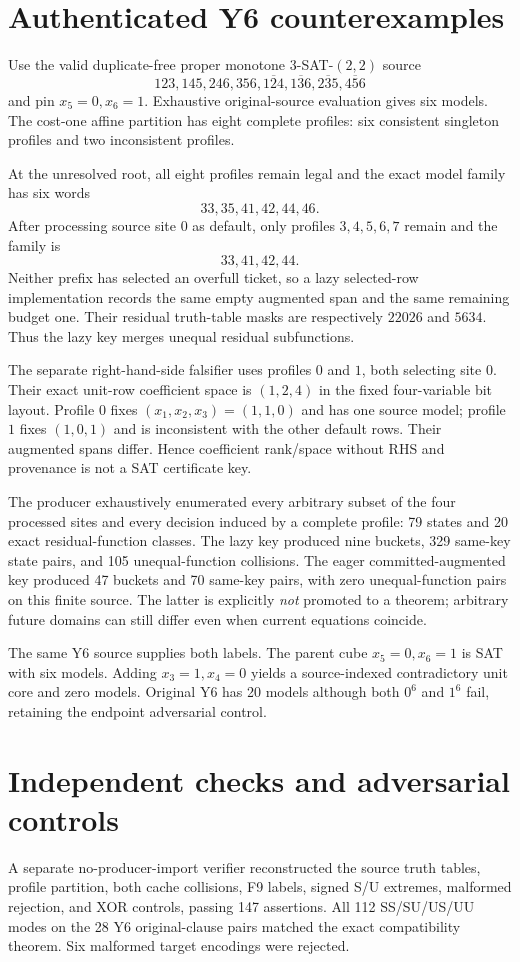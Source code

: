 \documentclass[11pt]{article}
\begin{document}
\section{Authenticated Y6 counterexamples}
Use the valid duplicate-free proper monotone 3-SAT-$(2,2)$ source
\[
123,145,246,356,\overline{124},\overline{136},\overline{235},\overline{456}
\]
and pin $x_5=0,x_6=1$.  Exhaustive original-source evaluation gives six models.  The cost-one affine partition has eight complete profiles: six consistent singleton profiles and two inconsistent profiles.

At the unresolved root, all eight profiles remain legal and the exact model family has six words
\[
 33,35,41,42,44,46.
\]
After processing source site $0$ as default, only profiles $3,4,5,6,7$ remain and the family is
\[
 33,41,42,44.
\]
Neither prefix has selected an overfull ticket, so a lazy selected-row implementation records the same empty augmented span and the same remaining budget one.  Their residual truth-table masks are respectively $22026$ and $5634$.  Thus the lazy key merges unequal residual subfunctions.

The separate right-hand-side falsifier uses profiles $0$ and $1$, both selecting site $0$.  Their exact unit-row coefficient space is $(1,2,4)$ in the fixed four-variable bit layout.  Profile $0$ fixes $(x_1,x_2,x_3)=(1,1,0)$ and has one source model; profile $1$ fixes $(1,0,1)$ and is inconsistent with the other default rows.  Their augmented spans differ.  Hence coefficient rank/space without RHS and provenance is not a SAT certificate key.

The producer exhaustively enumerated every arbitrary subset of the four processed sites and every decision induced by a complete profile: 79 states and 20 exact residual-function classes.  The lazy key produced nine buckets, 329 same-key state pairs, and 105 unequal-function collisions.  The eager committed-augmented key produced 47 buckets and 70 same-key pairs, with zero unequal-function pairs on this finite source.  The latter is explicitly \emph{not} promoted to a theorem; arbitrary future domains can still differ even when current equations coincide.

The same Y6 source supplies both labels.  The parent cube $x_5=0,x_6=1$ is SAT with six models.  Adding $x_3=1,x_4=0$ yields a source-indexed contradictory unit core and zero models.  Original Y6 has 20 models although both $0^6$ and $1^6$ fail, retaining the endpoint adversarial control.

\section{Independent checks and adversarial controls}
A separate no-producer-import verifier reconstructed the source truth tables, profile partition, both cache collisions, F9 labels, signed S/U extremes, malformed rejection, and XOR controls, passing 147 assertions.  All 112 SS/SU/US/UU modes on the 28 Y6 original-clause pairs matched the exact compatibility theorem.  Six malformed target encodings were rejected.
\end{document}
